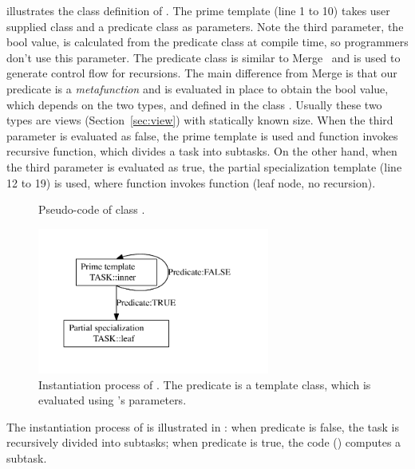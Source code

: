  illustrates the class definition of . The
prime template (line 1 to 10) takes  user supplied 
class and a predicate class as parameters. Note the third parameter, the bool value,
is calculated from the predicate class at compile time, so programmers don't
use this parameter. 
The predicate class is similar to Merge~\cite{merge} and is used to generate
control flow for recursions. The main difference from Merge is that our predicate is a
\emph{metafunction} and is evaluated in place to obtain the bool value, which
depends on the two types,  and 
defined in the class . Usually these two types are views (Section~\ref{sec:view})
with statically known size. When the third parameter is evaluated as false, the
prime template is used and  function invokes recursive
 function, which divides a task into subtasks.
On the other hand, when the third parameter is evaluated as true, the partial
specialization template (line 12 to 19) is used, where  function
invokes  function (leaf node, no recursion).


\begin{figure}[hbt]
  \caption{Pseudo-code of class .}
  \label{fig:tf:code}
\end{figure}

\begin{figure}[hpt]
  \includegraphics[width=3.0in]{../algo}
  \caption{Instantiation process of . The predicate is a template
class, which is evaluated using 's parameters.}
  \label{fig:hierarchy}
\end{figure}

The instantiation process of  is illustrated in :
when predicate is false, the task is recursively divided into subtasks; when predicate
is true, the code () computes a subtask.


